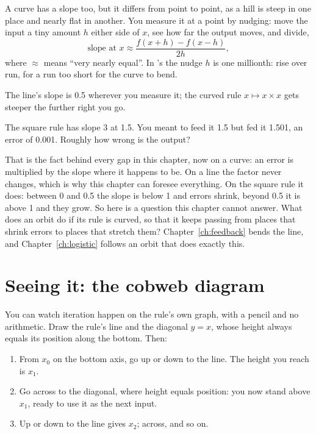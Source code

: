 A curve has a slope too, but it differs from point to point, as a hill is
steep in one place and nearly flat in another. You measure it at a point by
nudging: move the input a tiny amount $h$ either side of $x$, see how far
the output moves, and divide,
\[ \text{slope at } x \approx \frac{f(x + h) - f(x - h)}{2h} , \]
where $\approx$ means \enquote{very nearly equal}. In 's
 the nudge $h$ is one millionth: rise over run, for a run too
short for the curve to bend.



\noindent
The line's slope is \num{0.5} wherever you measure it; the curved rule
$x \mapsto x \times x$ gets steeper the further right you go.

\begin{think}
The square rule has slope $3$ at \num{1.5}. You meant to feed it \num{1.5}
but fed it \num{1.501}, an error of \num{0.001}. Roughly how wrong is the
output?
\end{think}
That is the fact behind every gap in this chapter, now on a curve: an error
is multiplied by the slope where it happens to be. On a line the factor
never changes, which is why this chapter can foresee everything. On the
square rule it does: between $0$ and \num{0.5} the slope is below 1 and
errors shrink, beyond \num{0.5} it is above 1 and they grow. So here is a
question this chapter cannot answer. What does an orbit do if its rule is
curved, so that it keeps passing from places that shrink errors to places
that stretch them? Chapter~\ref{ch:feedback} bends the line, and
Chapter~\ref{ch:logistic} follows an orbit that does exactly this.

\section{Seeing it: the cobweb diagram}
\label{sec:ch02-cobweb}

\noindent
You can watch iteration happen on the rule's own graph, with a pencil and
no arithmetic. Draw the rule's line and the diagonal $y = x$, whose height
always equals its position along the bottom. Then:

\begin{enumerate}
\item From $x_0$ on the bottom axis, go up or down to the line. The height
  you reach is $x_1$.
\item Go across to the diagonal, where height equals position: you now
  stand above $x_1$, ready to use it as the next input.
\item Up or down to the line gives $x_2$; across, and so on.
\end{enumerate}

